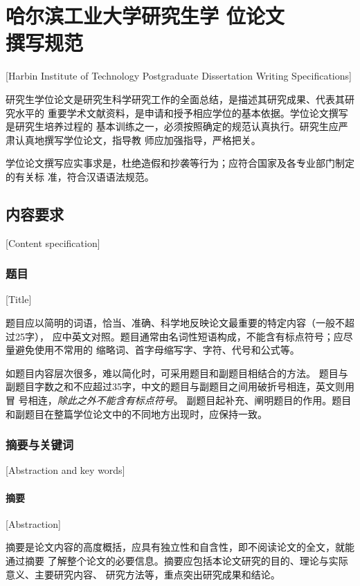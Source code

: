 
\chapter[哈尔滨工业大学研究生学位论文撰写规范]{哈尔滨工业大学研究生学
  位论文\protect\\撰写规范}[Harbin Institute of Technology Postgraduate Dissertation Writing Specifications]

研究生学位论文是研究生科学研究工作的全面总结，是描述其研究成果、代表其研究水平的
重要学术文献资料，是申请和授予相应学位的基本依据。学位论文撰写是研究生培养过程的
基本训练之一，必须按照确定的规范认真执行。研究生应严肃认真地撰写学位论文，指导教
师应加强指导，严格把关。

学位论文撰写应实事求是，杜绝造假和抄袭等行为；应符合国家及各专业部门制定的有关标
准，符合汉语语法规范。



\section{内容要求}[Content specification]

\subsection{题目}[Title]

题目应以简明的词语，恰当、准确、科学地反映论文最重要的特定内容（一般不超过25字），
应中英文对照。题目通常由名词性短语构成，不能含有标点符号；应尽量避免使用不常用的
缩略词、首字母缩写字、字符、代号和公式等。

如题目内容层次很多，难以简化时，可采用题目和副题目相结合的方法。
题目与副题目字数之和不应超过35字，中文的题目与副题目之间用破折号相连，英文则用冒
号相连，\emph{除此之外不能含有标点符号}。
副题目起补充、阐明题目的作用。题目和副题目在整篇学位论文中的不同地方出现时，应保持一致。

\subsection{摘要与关键词}[Abstraction and key words]
\subsubsection{摘要}[Abstraction]

摘要是论文内容的高度概括，应具有独立性和自含性，即不阅读论文的全文，就能通过摘要
了解整个论文的必要信息。摘要应包括本论文研究的目的、理论与实际意义、主要研究内容、
研究方法等，重点突出研究成果和结论。

